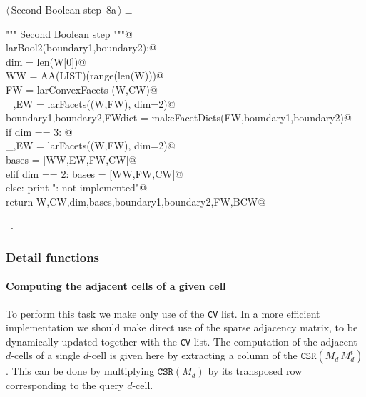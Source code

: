 \documentclass[11pt,oneside]{article}	%
\begin{document}
\begin{flushleft} \small \label{scrap5}
\protect{}$\langle\,$Second Boolean step\nobreak\ {\footnotesize 8a}$\,\rangle\equiv$
\vspace{-1ex}
\begin{list}{}{} \item
\mbox{}\verb@""" Second Boolean step """@\\
\mbox{}\verb@def larBool2(boundary1,boundary2):@\\
\mbox{}\verb@   dim = len(W[0])@\\
\mbox{}\verb@   WW = AA(LIST)(range(len(W)))@\\
\mbox{}\verb@   FW = larConvexFacets (W,CW)@\\
\mbox{}\verb@   _,EW = larFacets((W,FW), dim=2)@\\
\mbox{}\verb@   boundary1,boundary2,FWdict = makeFacetDicts(FW,boundary1,boundary2)@\\
\mbox{}\verb@   if dim == 3: @\\
\mbox{}\verb@      _,EW = larFacets((W,FW), dim=2)@\\
\mbox{}\verb@      bases = [WW,EW,FW,CW]@\\
\mbox{}\verb@   elif dim == 2: bases = [WW,FW,CW]@\\
\mbox{}\verb@   else: print "\nerror: not implemented\n"@\\
\mbox{}\verb@   return W,CW,dim,bases,boundary1,boundary2,FW,BCW@\\
\mbox{}\verb@@{\NWsep}
\end{list}
\vspace{-1ex}
\footnotesize\addtolength{\baselineskip}{-1ex}
\begin{list}{}{\setlength{\itemsep}{-\parsep}\setlength{\itemindent}{-\leftmargin}}
\item \NWtxtMacroRefIn\ .
\end{list}
\end{flushleft}

\subsubsection{Detail functions}


\paragraph{Computing the adjacent cells of a given cell}
To perform this task we make only use of the \texttt{CV} list. In a more efficient implementation we should make direct use of the sparse adjacency matrix, to be dynamically updated together with the \texttt{CV} list.
The computation of the adjacent $d$-cells of a single $d$-cell is given here by extracting a column of the $\texttt{CSR}(M_d\, M_d^t)$. This can be done by multiplying $\texttt{CSR}(M_d)$ by its transposed row corresponding to the query $d$-cell. 
\end{document}
